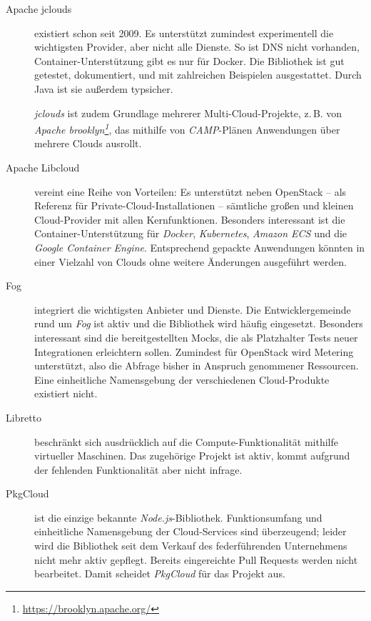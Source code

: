 \begin{description}
	
	\item[Apache jclouds] existiert schon seit 2009. Es unterstützt zumindest experimentell die wichtigsten Provider, aber nicht alle Dienste. So ist DNS nicht vorhanden, Container-Unterstützung gibt es nur für Docker. Die Bibliothek ist gut getestet, dokumentiert, und mit zahlreichen Beispielen ausgestattet. Durch Java ist sie außerdem typsicher. 
	
	\emph{jclouds} ist zudem Grundlage mehrerer Multi-Cloud-Projekte, z.\,B. von \emph{Apache brooklyn\footnote{\url{https://brooklyn.apache.org/}}}, das mithilfe von \emph{CAMP}-Plänen Anwendungen über mehrere Clouds ausrollt.
	
	\item[Apache Libcloud] vereint eine Reihe von Vorteilen: Es unterstützt neben OpenStack -- als Referenz für Private-Cloud-Installationen -- sämtliche großen und kleinen Cloud-Provider mit allen Kernfunktionen. Besonders interessant ist die Container-Unterstützung für \emph{Docker}, \emph{Kubernetes}, \emph{Amazon ECS} und die \emph{Google Container Engine}. Entsprechend gepackte Anwendungen könnten in einer Vielzahl von Clouds ohne weitere Änderungen ausgeführt werden.
	
	\item[Fog] integriert die wichtigsten Anbieter und Dienste. Die Entwicklergemeinde rund um \emph{Fog} ist aktiv und die Bibliothek wird häufig eingesetzt. Besonders interessant sind die bereitgestellten Mocks, die als Platzhalter Tests neuer Integrationen erleichtern sollen. Zumindest für OpenStack wird Metering unterstützt, also die Abfrage bisher in Anspruch genommener Ressourcen. Eine einheitliche Namensgebung der verschiedenen Cloud-Produkte existiert nicht.
	
	\item[Libretto] beschränkt sich ausdrücklich auf die Compute-Funktionalität mithilfe virtueller Maschinen. Das zugehörige Projekt ist aktiv, kommt aufgrund der fehlenden Funktionalität aber nicht infrage.
	
	\item[PkgCloud] ist die einzige bekannte \emph{Node.js}-Bibliothek. Funktionsumfang und einheitliche Namensgebung der Cloud-Services sind überzeugend; leider wird die Bibliothek seit dem Verkauf des federführenden Unternehmens nicht mehr aktiv gepflegt. Bereits eingereichte Pull Requests werden nicht bearbeitet. Damit scheidet \emph{PkgCloud} für das Projekt aus.
	
\end{description}

